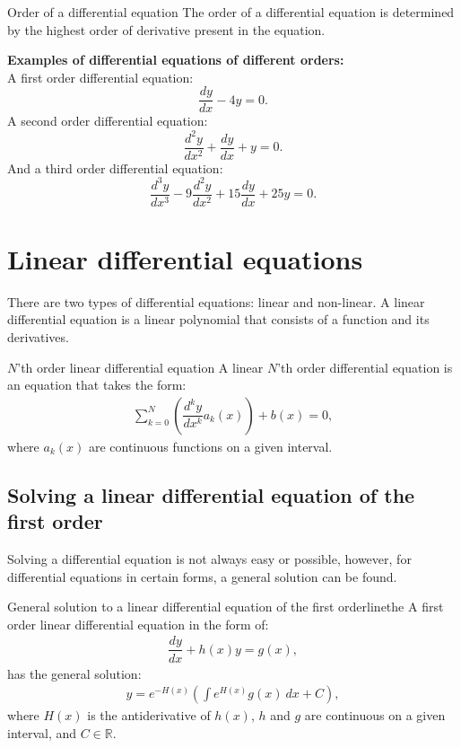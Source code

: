 \clearpage

\begin{definition}{Order of a differential equation}{}
The order of a differential equation is determined by the highest order of derivative present in the equation.
\end{definition} 

\noindent
\textbf{Examples of differential equations of different orders:}
\\
A first order differential equation:
$$\frac{dy}{dx}-4y=0. $$
A second order differential equation:
$$\frac{d^2y}{dx^2}+\frac{dy}{dx}+y = 0.$$
And a third order differential equation:
$$\frac{d^3y}{dx^3} - 9\frac{d^2y}{dx^2} + 15\frac{dy}{dx} + 25y = 0.$$

\section{Linear differential equations}
There are two types of differential equations: linear and non-linear. A linear differential equation is a linear polynomial that consists of a function and its derivatives.
\begin{definition}{$N$'th order linear differential equation}{}
A linear $N$'th order differential equation is an equation that takes the form:
\begin{align*}
\sum_{k=0}^{N}\left(\dfrac{d^ky}{dx^k}a_k(x)\right)+b(x)=0,
\end{align*}
where $a_k(x)$ are continuous functions on a given interval.
\end{definition}
\subsection{Solving a linear differential equation of the first order}
Solving  a differential equation is not always easy or possible, however, for differential equations in certain forms, a general solution can be found.

\begin{theorem}{General solution to a linear differential equation of the first order}{linethe}
A first order linear differential equation in the form of:
\begin{align} \label{FODE_form}
\dfrac{dy}{dx}+h(x)y=g(x),
\end{align}
has the general solution:
\begin{align} \label{FODE_solution}
y=e^{-H(x)}\left(\int e^{H(x)}g(x)\ dx+C\right),
\end{align}
where $H(x)$ is the antiderivative of $h(x)$, $h$ and $g$ are continuous on a given interval, and $C\in \mathbb{R}$.
\end{theorem}

